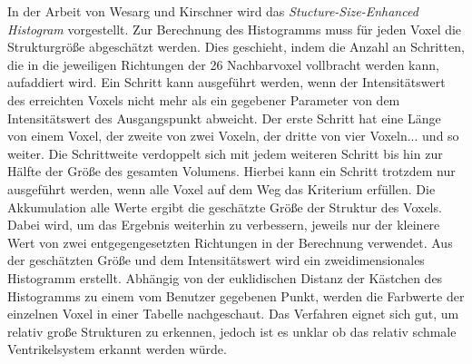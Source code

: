In der Arbeit von Wesarg und Kirschner \cite{wesarg2009structure, wesarg20102d} wird das \textit{Stucture-Size-Enhanced Histogram} vorgestellt.
\newline
Zur Berechnung des Histogramms  muss für jeden Voxel die Strukturgröße abgeschätzt werden. Dies geschieht, indem die Anzahl an Schritten, die in die jeweiligen Richtungen der 26 Nachbarvoxel vollbracht werden kann, aufaddiert wird. Ein Schritt kann ausgeführt werden, wenn der Intensitätswert des erreichten Voxels nicht mehr als ein gegebener Parameter von dem Intensitätswert des Ausgangspunkt abweicht.
\newline
Der erste Schritt hat eine Länge von einem Voxel, der zweite von zwei Voxeln, der dritte von vier Voxeln... und so weiter. Die Schrittweite verdoppelt sich mit jedem weiteren Schritt bis hin zur Hälfte der Größe des gesamten Volumens. Hierbei kann ein Schritt trotzdem nur ausgeführt werden, wenn alle Voxel auf dem Weg das Kriterium erfüllen. Die Akkumulation alle Werte ergibt die geschätzte Größe der Struktur des Voxels. Dabei wird, um das Ergebnis weiterhin zu verbessern,  jeweils nur der kleinere Wert von zwei entgegengesetzten Richtungen in der Berechnung verwendet. 
\newline
Aus der geschätzten Größe und dem Intensitätswert wird ein zweidimensionales Histogramm erstellt. Abhängig von der euklidischen Distanz der Kästchen des Histogramms zu einem vom Benutzer gegebenen Punkt, werden die Farbwerte der einzelnen Voxel in einer Tabelle nachgeschaut.
\newline
Das Verfahren eignet sich gut, um relativ große Strukturen zu erkennen, jedoch ist es unklar ob das relativ schmale Ventrikelsystem erkannt werden würde.


